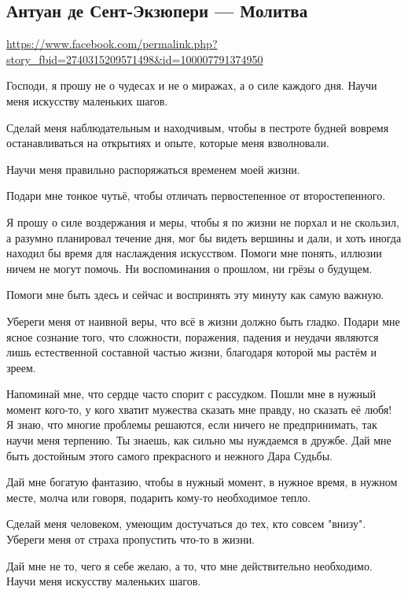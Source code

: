  
 

\subsection{Антуан де Сент-Экзюпери --- Молитва}

\url{https://www.facebook.com/permalink.php?story_fbid=2740315209571498&id=100007791374950}

Господи, я прошу не о чудесах и не о миражах, а о силе каждого дня.  Научи меня
искусству маленьких шагов.

Сделай меня наблюдательным и находчивым, чтобы в пестроте будней вовремя
останавливаться на открытиях и опыте, которые меня взволновали.

Научи меня правильно распоряжаться временем моей жизни.

Подари мне тонкое чутьё, чтобы отличать первостепенное от второстепенного.

Я прошу о силе воздержания и меры, чтобы я по жизни не порхал и не скользил, а
разумно планировал течение дня, мог бы видеть вершины и дали, и хоть иногда
находил бы время для наслаждения искусством.  Помоги мне понять, иллюзии ничем
не могут помочь. Ни воспоминания о прошлом, ни грёзы о будущем.

Помоги мне быть здесь и сейчас и воспринять эту минуту как самую важную.

Убереги меня от наивной веры, что всё в жизни должно быть гладко.  Подари мне
ясное сознание того, что сложности, поражения, падения и неудачи являются лишь
естественной составной частью жизни, благодаря которой мы растём и зреем.

Напоминай мне, что сердце часто спорит с рассудком.  Пошли мне в нужный момент
кого-то, у кого хватит мужества сказать мне правду, но сказать её любя!  Я
знаю, что многие проблемы решаются, если ничего не предпринимать, так научи
меня терпению.  Ты знаешь, как сильно мы нуждаемся в дружбе. Дай мне быть
достойным этого самого прекрасного и нежного Дара Судьбы.

Дай мне богатую фантазию, чтобы в нужный момент, в нужное время, в нужном месте, молча или говоря, подарить кому-то необходимое тепло.

Сделай меня человеком, умеющим достучаться до тех, кто совсем "внизу".  Убереги
меня от страха пропустить что-то в жизни.

Дай мне не то, чего я себе желаю, а то, что мне действительно необходимо.
Научи меня искусству маленьких шагов.
